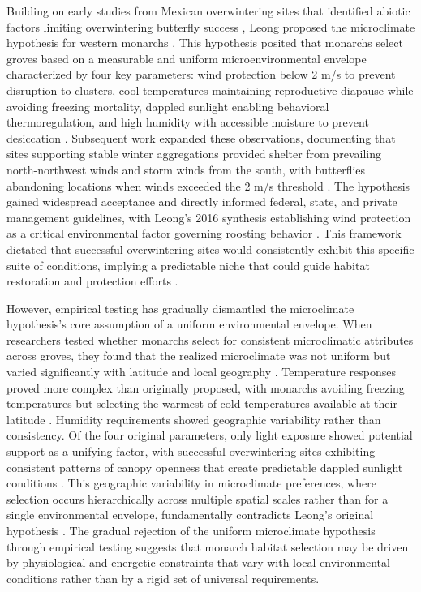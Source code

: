 Building on early studies from Mexican overwintering sites that identified abiotic factors limiting overwintering butterfly success \citep{andersonFreezeProtectionOverwintering1996,calvertEffectRainSnow1983}, Leong proposed the microclimate hypothesis for western monarchs \citep{leongMicroenvironmentalFactorsAssociated1990}. This hypothesis posited that monarchs select groves based on a measurable and uniform microenvironmental envelope characterized by four key parameters: wind protection below 2 m/s to prevent disruption to clusters, cool temperatures maintaining reproductive diapause while avoiding freezing mortality, dappled sunlight enabling behavioral thermoregulation, and high humidity with accessible moisture to prevent desiccation \citep{leongMicroenvironmentalFactorsAssociated1990}. Subsequent work expanded these observations, documenting that sites supporting stable winter aggregations provided shelter from prevailing north-northwest winds and storm winds from the south, with butterflies abandoning locations when winds exceeded the 2 m/s threshold \citep{leongMicroenvironmentalFactorsAssociated1991,leongAnalysisPatternDistribution2004}. The hypothesis gained widespread acceptance and directly informed federal, state, and private management guidelines, with Leong's 2016 synthesis establishing wind protection as a critical environmental factor governing roosting behavior \citep{leongEvaluationManagementCalifornia2016}. This framework dictated that successful overwintering sites would consistently exhibit this specific suite of conditions, implying a predictable niche that could guide habitat restoration and protection efforts \citep{peltonStateMonarchButterfly2016}.

However, empirical testing has gradually dismantled the microclimate hypothesis's core assumption of a uniform environmental envelope. When researchers tested whether monarchs select for consistent microclimatic attributes across groves, they found that the realized microclimate was not uniform but varied significantly with latitude and local geography \citep{sanieeHierarchyScaleInfluence2022}. Temperature responses proved more complex than originally proposed, with monarchs avoiding freezing temperatures but selecting the warmest of cold temperatures available at their latitude \citep{fisherClimaticNicheModel2018}. Humidity requirements showed geographic variability rather than consistency. Of the four original parameters, only light exposure showed potential support as a unifying factor, with successful overwintering sites exhibiting consistent patterns of canopy openness that create predictable dappled sunlight conditions \citep{sanieeHierarchyScaleInfluence2022}. This geographic variability in microclimate preferences, where selection occurs hierarchically across multiple spatial scales rather than for a single environmental envelope, fundamentally contradicts Leong's original hypothesis \citep{fisherClimaticNicheModel2018; sanieeHierarchyScaleInfluence2022}. The gradual rejection of the uniform microclimate hypothesis through empirical testing suggests that monarch habitat selection may be driven by physiological and energetic constraints that vary with local environmental conditions rather than by a rigid set of universal requirements.

